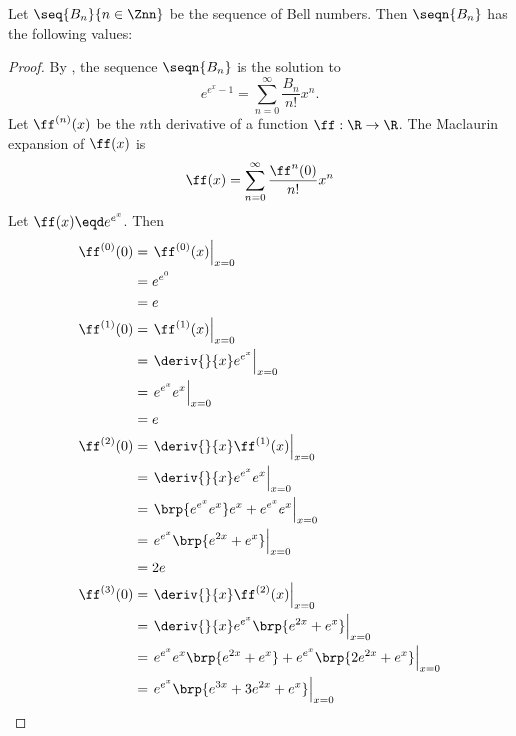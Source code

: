 {%
\begin{proposition}
\label{prop:bell_e}
Let $\seq{B_n}{n\in\Znn}$ be the sequence of Bell numbers.
Then $\seqn{B_n}$ has the following values:
\end{proposition}
\begin{proof}
By , the sequence $\seqn{B_n}$ is the solution to
  \[  e^{e^x-1} = \sum_{n=0}^\infty \frac{B_n}{n!} x^n. \]
Let $\ff^{(n)}(x)$ be the $n$th derivative of a function $\ff:\R\to\R$.
The Maclaurin expansion of $\ff(x)$ is
  \[ \ff(x) = \sum_{n=0}^\infty \frac{\ff^{n}(0)}{n!} x^n \]
Let $\ff(x)\eqd e^{e^x}$. Then
\begin{align*}
  \ff^{(0)}(0)
    &= \left.\ff^{(0)}(x)\right|_{x=0}
  \\&= e^{e^0}
  \\&= e
  \\
  \ff^{(1)}(0)
    &= \left.\ff^{(1)}(x)\right|_{x=0}
  \\&= \left.\deriv{}{x} e^{e^x} \right|_{x=0}
  \\&= \left. e^{e^x} e^x \right|_{x=0}
  \\&= e
  \\
  \ff^{(2)}(0)
    &= \left.\deriv{}{x}\ff^{(1)}(x)\right|_{x=0}
  \\&= \left.\deriv{}{x} e^{e^x} e^x \right|_{x=0}
  \\&= \left.\brp{e^{e^x} e^x}e^x + e^{e^x}e^x \right|_{x=0}
  \\&= \left. e^{e^x} \brp{e^{2x} + e^x} \right|_{x=0}
  \\&= 2e
  \\
  \ff^{(3)}(0)
    &= \left.\deriv{}{x}\ff^{(2)}(x)\right|_{x=0}
  \\&= \left. \deriv{}{x} e^{e^x} \brp{e^{2x} + e^x} \right|_{x=0}
  \\&= \left. e^{e^x} e^x \brp{e^{2x} + e^x} + e^{e^x} \brp{2e^{2x} + e^x} \right|_{x=0}
  \\&= \left. e^{e^x} \brp{e^{3x} + 3e^{2x} + e^x}  \right|_{x=0}

\end{align*}
\end{proof}}
